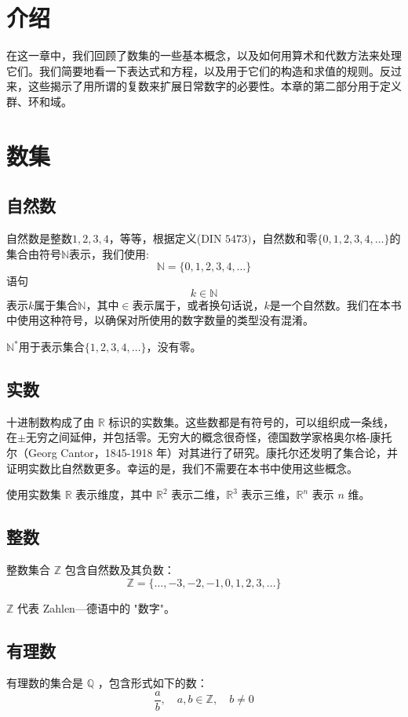 
\section{介绍}
在这一章中，我们回顾了数集的一些基本概念，以及如何用算术和代数方法来处理它们。我们简要地看一下表达式和方程，以及用于它们的构造和求值的规则。反过来，这些揭示了用所谓的复数来扩展日常数字的必要性。本章的第二部分用于定义群、环和域。

\section{数集}
\subsection{自然数}
自然数是整数$1,2,3,4$，等等，根据定义(DIN $5473)$，自然数和零$\{0,1,2,3,4,\ldots\}$的集合由符号$\mathbb{N}$表示，我们使用:
$$
    \mathbb{N}=\{0,1,2,3,4, \ldots\}
$$
语句
$$
    k \in \mathbb{N}
$$
表示$k$属于集合$\mathbb{N}$，其中$\in$表示属于，或者换句话说，$k$是一个自然数。我们在本书中使用这种符号，以确保对所使用的数字数量的类型没有混淆。

$\mathbb{N}^{*}$用于表示集合$\{1,2,3,4,\ldots\}$，没有零。

\subsection{实数}
十进制数构成了由 $\mathbb{R}$ 标识的实数集。这些数都是有符号的，可以组织成一条线，在$\pm $无穷之间延伸，并包括零。无穷大的概念很奇怪，德国数学家格奥尔格-康托尔（Georg Cantor，1845-1918 年）对其进行了研究。康托尔还发明了集合论，并证明实数比自然数更多。幸运的是，我们不需要在本书中使用这些概念。

使用实数集 $\mathbb{R}$ 表示维度，其中 $\mathbb{R}^{2}$ 表示二维，$\mathbb{R}^{3}$ 表示三维，$\mathbb{R}^{n}$ 表示 $n$ 维。

\subsection{整数}
整数集合 $\mathbb{Z}$ 包含自然数及其负数：
$$
    \mathbb{Z}=\{\ldots,-3,-2,-1,0,1,2,3, \ldots\}
$$

$\mathbb{Z}$ 代表 Zahlen---德语中的 "数字"。

\subsection{有理数}
有理数的集合是 $\mathbb{Q}$ ，包含形式如下的数：
$$
    \frac{a}{b}, \quad a, b \in \mathbb{Z}, \quad b \neq 0
$$

